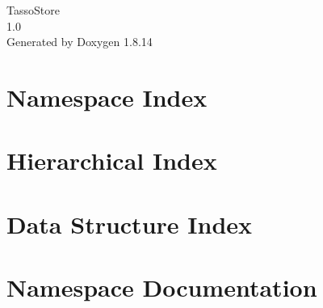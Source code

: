 \documentclass[twoside]{book}
\newcommand{\+}{\discretionary{\mbox{\scriptsize$\hookleftarrow$}}{}{}}
\newcommand{\clearemptydoublepage}{%
  \newpage{\pagestyle{empty}\cleardoublepage}%
}
\begin{document}
\hypersetup{pageanchor=false,
             bookmarksnumbered=true,
             pdfencoding=unicode
            }
\begin{titlepage}
\vspace*{7cm}
\begin{center}%
{\Large Tasso\+Store \\[1ex]\large 1.\+0 }\\
\vspace*{1cm}
{\large Generated by Doxygen 1.8.14}\\
\end{center}
\end{titlepage}
\clearemptydoublepage
{}
\tableofcontents
\clearemptydoublepage
{}
\hypersetup{pageanchor=true}

\chapter{Namespace Index}

\chapter{Hierarchical Index}

\chapter{Data Structure Index}

\chapter{Namespace Documentation}

\end{document}
